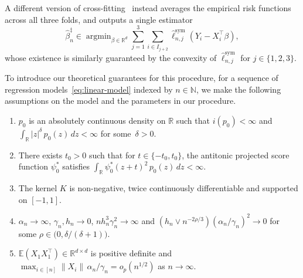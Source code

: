 \documentclass[a4paper]{article}
\newcommand{\N}{\mathbb{N}}
\newcommand{\R}{\mathbb{R}}
\newcommand{\E}{\mathbb{E}}
\newcommand{\norm}[1]{\|{#1}\|}
\DeclareMathOperator*{\argmin}{argmin}
\theoremstyle{definition}
\begin{document}
A different version of cross-fitting~\citep[Definition~3.2]{chernozhukov2018double} instead averages the empirical risk functions across all three folds, and outputs a single estimator
\begin{equation}
\label{eq:DML2}
\hat{\beta}_n^\ddagger \in \argmin_{\beta \in \R^d} \sum_{j=1}^3 \sum_{i \in I_{j+2}} \hat{\ell}_{n,j}^{\mathrm{sym}}(Y_i - X_i^\top\beta),
\end{equation}
whose existence is similarly guaranteed by the convexity of $\hat{\ell}_{n,j}^{\mathrm{sym}}$ for $j \in \{1,2,3\}$.

To introduce our theoretical guarantees for this procedure, for a sequence of regression models~\eqref{eq:linear-model} indexed by $n \in \N$, we make the following assumptions on the model and the parameters in our procedure. 
\begin{enumerate}[label=(A\arabic*)]
\item \label{ass:fisher-finite} $p_0$ is an absolutely continuous density on $\R$ such that $i(p_0) < \infty$ and $\int_\R |z|^\delta\,p_0(z)\,dz < \infty$ for some~$\delta > 0$.
\item \label{ass:psi0-star} There exists $t_0 > 0$ such that for $t \in \{-t_0,t_0\}$, the antitonic projected score function $\psi_0^*$ satisfies $\int_\R \psi_0^*(z + t)^2\,p_0(z)\,dz < \infty$.
\item \label{ass:kernel} The kernel $K$ is non-negative, twice continuously differentiable and supported on $[-1,1]$.
\item \label{ass:alpha-gamma-h} $\alpha_n \to \infty$,\; $\gamma_n, h_n \to 0$,\; $nh_n^3\gamma_n^2 \to \infty$ and $(h_n \vee n^{-2\rho/3})(\alpha_n/\gamma_n)^2 \to 0$ for some $\rho \in \bigl(0,\delta/(\delta + 1)\bigr)$.
\item \label{ass:covariates} $\E(X_1 X_1^\top) \in \R^{d \times d}$ is positive definite and $\max_{i \in [n]}\norm{X_i}\,\alpha_n/\gamma_n = o_p(n^{1/2})$ as $n \to \infty$.
\end{enumerate}
\end{document}
